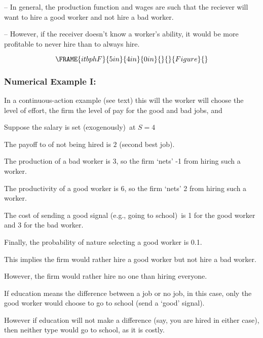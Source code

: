 \documentclass{article}
\begin{document}
-- In general, the production function and wages are such that the reciever
will want to hire a good worker and not hire a bad worker.

-- However, if the receiver doesn't know a worker's ability, it would be
more profitable to never hire than to always hire.\bigskip 

\begin{equation}
\FRAME{itbphF}{5in}{4in}{0in}{}{}{Figure}{\special{language "Scientific
Word";type "GRAPHIC";maintain-aspect-ratio TRUE;display "USEDEF";valid_file
"T";width 5in;height 4in;depth 0in;original-width 7.3172in;original-height
4.9078in;cropleft "0";croptop "1";cropright "1";cropbottom "0";tempfilename
'JSH9C623.wmf';tempfile-properties "XPR";}}
\end{equation}

\subsubsection{Numerical Example I:}

In a continuous-action example (see text) this will the worker will choose
the level of effort, the firm the level of pay for the good and bad jobs, and

\bigskip

Suppose the salary is set (exogenously)\ at $S=4$

The payoff to of not being hired is $2$ (second best job).

The production of a bad worker is $3$, so the firm `nets' -1 from hiring
such a worker.

The productivity of a good worker is $6$, so the firm `nets' 2 from hiring
such a worker.

The cost of sending a good signal (e.g., going to school)\ is 1 for the good
worker and 3 for the bad worker.

\bigskip

Finally, the probability of nature selecting a good worker is 0.1. \ 

This implies the firm would rather hire a good worker but not hire a bad
worker.

However, the firm would rather hire no one than hiring everyone.

If education means the difference between a job or no job, in this case,
only the good worker would choose to go to school (send a `good' signal).

However if education will not make a difference (say, you are hired in
either case), then neither type would go to school, as it is costly.
\end{document}
